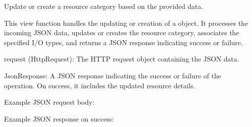 \documentclass[letterpaper,10pt,english]{sphinxmanual}
\begin{document}

\begin{fulllineitems}
\label{\detokenize{app:app.views.update_resource}}
\pysigstartsignatures
{}
\pysigstopsignatures
\sphinxAtStartPar
Update or create a resource category based on the provided data.

\sphinxAtStartPar
This view function handles the updating or creation of a  
object. It processes the incoming JSON data, updates or creates the resource 
category, associates the specified I/O types, and returns a JSON response 
indicating success or failure.
\begin{description}
\sphinxAtStartPar
request (HttpRequest): The HTTP request object containing the JSON data.

\sphinxAtStartPar
JsonResponse: A JSON response indicating the success or failure of the operation. 
On success, it includes the updated resource details.

\sphinxAtStartPar
Example JSON request body:

\begin{sphinxVerbatim}[commandchars=\\\{\}]
\PYG{p}{[}\PYG{p}{]}
\end{sphinxVerbatim}

\sphinxAtStartPar
Example JSON response on success:

\begin{sphinxVerbatim}[commandchars=\\\{\}]
\PYG{p}{[}\PYG{p}{]}
\end{sphinxVerbatim}


\end{description}
\end{fulllineitems}
\end{document}
